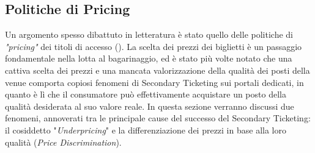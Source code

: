 \subsection{Politiche di Pricing} \label{price}
Un argomento spesso dibattuto in letteratura è stato quello delle politiche di \textit{"pricing"} dei titoli di accesso (\cite{courty2012impact, bhave2017primary, esteves2009price, courty2011unpriced}). La scelta dei prezzi dei biglietti è un passaggio fondamentale nella lotta al bagarinaggio, ed è stato più volte notato che una cattiva scelta dei prezzi e una mancata valorizzazione della qualità dei posti della venue comporta copiosi fenomeni di Secondary Ticketing sui portali dedicati, in quanto è lì che il consumatore può effettivamente acquistare un posto della qualità desiderata al suo valore reale. In questa sezione verranno discussi due fenomeni, annoverati tra le principale cause del successo del Secondary Ticketing: il cosiddetto "\textit{Underpricing}" e la differenziazione dei prezzi in base alla loro qualità (\textit{Price Discrimination}).

